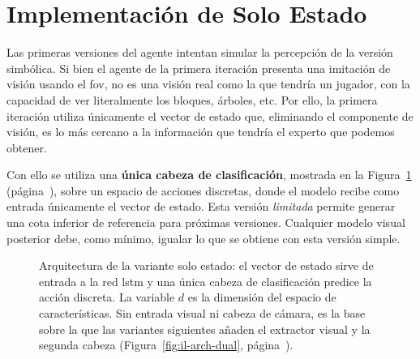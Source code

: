 \section{Implementación de Solo Estado}
\label{sec:solo-estado}
Las primeras versiones del agente intentan simular la percepción de la versión simbólica.
Si bien el agente de la primera iteración presenta una imitación de visión usando el \gls{fov},
no es una visión real como la que tendría un jugador, con la capacidad de ver literalmente los bloques, árboles, etc.
Por ello, la primera iteración utiliza únicamente el vector de estado que, eliminando el componente de visión,
es lo más cercano a la información que tendría el experto que podemos obtener.

Con ello se utiliza una \textbf{única cabeza de clasificación}, 
mostrada en la Figura~\ref{fig:il-arch-state} (página~\pageref{fig:il-arch-state}),
sobre un espacio de acciones discretas,
donde el modelo recibe como entrada únicamente el vector de estado. 
Esta versión \textit{limitada} permite generar
una cota inferior de referencia para próximas versiones.
Cualquier modelo visual posterior debe, como mínimo, igualar lo que se obtiene con
esta versión simple.

\begin{figure}[htbp]
  \centering
  \caption[Arquitectura de la variante solo-estado]{Arquitectura de la variante
  solo estado: el vector de estado sirve de entrada a la red \gls{lstm} y una
  única cabeza de clasificación predice la acción discreta. La variable $d$ es la 
  dimensión del espacio de características.
  Sin entrada visual ni cabeza de cámara, es la base sobre la que las variantes siguientes añaden el
  extractor visual y la segunda cabeza (Figura~\ref{fig:il-arch-dual}, página~\pageref{fig:il-arch-dual}).}
  \label{fig:il-arch-state}
\end{figure}

